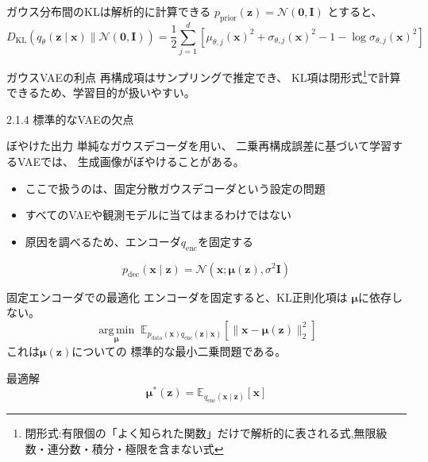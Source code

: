\begin{frame}{ガウス分布間のKLは解析的に計算できる}
    $p_{\mathrm{prior}}(\boldsymbol{z})=\mathcal{N}(\boldsymbol{0},\mathbf{I})$
    とすると、
    \small
    \[
        \boxed{
        D_{\mathrm{KL}}\!\left(
        q_\theta(\boldsymbol{z}\mid\boldsymbol{x})
        \|\mathcal{N}(\boldsymbol{0},\mathbf{I})
        \right)
        =
        \frac12\sum_{j=1}^{d}
        \left[
        \mu_{\theta,j}(\boldsymbol{x})^2
        +\sigma_{\theta,j}(\boldsymbol{x})^2
        -1-\log\sigma_{\theta,j}(\boldsymbol{x})^2
        \right]
        }
    \]
    \normalsize
    \begin{exampleblock}{ガウスVAEの利点}
        再構成項はサンプリングで推定でき、
        KL項は閉形式\footnote{閉形式:有限個の「よく知られた関数」だけで解析的に表される式,無限級数・連分数・積分・極限を含まない式}で計算できるため、学習目的が扱いやすい。
    \end{exampleblock}
\end{frame}
\begin{frame}{2.1.4 標準的なVAEの欠点}
    \begin{alertblock}{ぼやけた出力}
        単純なガウスデコーダを用い、
        二乗再構成誤差に基づいて学習するVAEでは、
        生成画像がぼやけることがある。
    \end{alertblock}
    \vspace{0.6em}
    \begin{itemize}
        \item ここで扱うのは、固定分散ガウスデコーダという設定の問題
        \item すべてのVAEや観測モデルに当てはまるわけではない
        \item 原因を調べるため、エンコーダ$q_{\mathrm{enc}}$を固定する
    \end{itemize}
    \[
        p_{\mathrm{dec}}(\boldsymbol{x}\mid\boldsymbol{z})
        =
        \mathcal{N}\!\left(
        \boldsymbol{x};
        \boldsymbol{\mu}(\boldsymbol{z}),\sigma^2\mathbf{I}
        \right)
    \]
\end{frame}
\begin{frame}{固定エンコーダでの最適化}
    エンコーダを固定すると、KL正則化項は
    $\boldsymbol{\mu}$に依存しない。
    \[
        \underset{\boldsymbol{\mu}}{\operatorname{arg\,min}}\;
        \mathbb{E}_{
        p_{\mathrm{data}}(\boldsymbol{x})
        q_{\mathrm{enc}}(\boldsymbol{z}\mid\boldsymbol{x})
        }
        \left[
        \|\boldsymbol{x}-\boldsymbol{\mu}(\boldsymbol{z})\|_2^2
        \right]
    \]
    これは$\boldsymbol{\mu}(\boldsymbol{z})$についての
    標準的な最小二乗問題である。
    \begin{block}{最適解}
        \[
            \boxed{
            \boldsymbol{\mu}^{*}(\boldsymbol{z})
            =
            \mathbb{E}_{q_{\mathrm{enc}}(
            \boldsymbol{x}\mid\boldsymbol{z})}
            [\boldsymbol{x}]
            }
        \]
    \end{block}
\end{frame}
